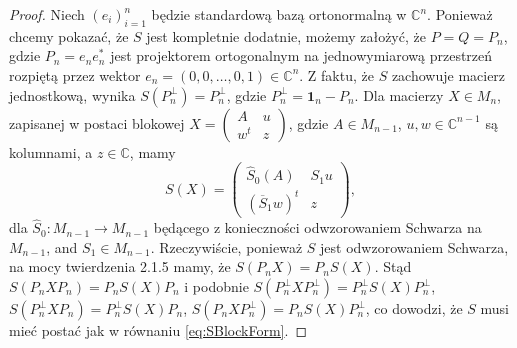 \begin{proof}
Niech $(e_{i})_{i=1}^{n}$
będzie standardową bazą ortonormalną w $\mathbb{C}^{n}$.
Ponieważ chcemy pokazać, że $S$ jest kompletnie dodatnie,
możemy założyć, że $P = Q = P_{n}$,
gdzie $P_{n} = e_{n} e_{n}^{*}$ jest projektorem ortogonalnym na jednowymiarową
przestrzeń rozpiętą przez wektor $e_{n} = (0,0,\ldots,0,1) \in \mathbb{C}^{n}$.
Z faktu, że $S$ zachowuje macierz jednostkową, wynika
$S(P_{n}^{\perp}) = P_{n}^{\perp}$,
gdzie $P_{n}^{\perp} = \mathbf{1}_{n} - P_{n}$.
Dla macierzy $X \in M_{n}$,
zapisanej w postaci blokowej
$X = \left( \begin{smallmatrix} A & u \\ w^{t} & z \end{smallmatrix} \right)$,
gdzie $A \in M_{n-1}$, $u, w \in \mathbb{C}^{n-1}$ są kolumnami, a
$z \in \mathbb{C}$, mamy
\begin{equation}
\label{eq:SBlockForm}
    S (X) = \begin{pmatrix}
        \hat{S}_{0}(A) & S_{1} u \\
        (\overline{S}_{1} w)^{t} & z
    \end{pmatrix},
\end{equation}
dla $\hat{S}_{0}: M_{n-1} \rightarrow M_{n-1}$ będącego z konieczności
odwzorowaniem Schwarza na $M_{n-1}$, and $S_{1} \in M_{n-1}$.
Rzeczywiście, ponieważ $S$ jest odwzorowaniem Schwarza,
na mocy twierdzenia 2.1.5 \cite{Stormer2013} mamy, że
$S(P_{n} X) = P_{n} S(X)$.
Stąd
$S(P_{n} X P_{n}) = P_{n} S(X) P_{n}$ i podobnie
$S(P_{n}^{\perp} X P_{n}^{\perp}) = P_{n}^{\perp} S(X) P_{n}^{\perp}$,
$S(P_{n}^{\perp} X P_{n}) = P_{n}^{\perp} S(X) P_{n}$,
$S(P_{n} X P_{n}^{\perp}) = P_{n} S(X) P_{n}^{\perp}$,
co dowodzi, że $S$ musi mieć postać jak w równaniu \eqref{eq:SBlockForm}.


\end{proof}

